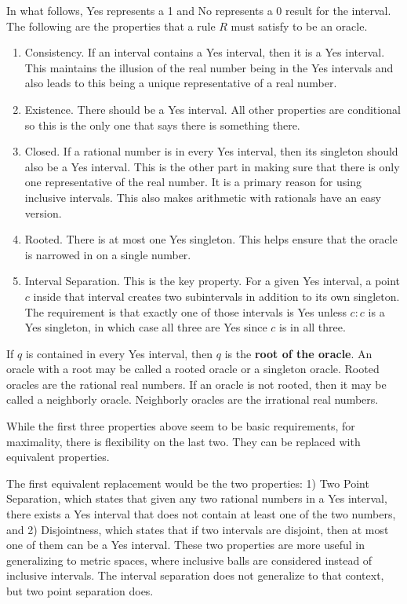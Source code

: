 \documentclass[12pt]{article}
\begin{document}
In what follows, Yes represents a 1 and No represents a 0 result for the interval. The following are the properties that a rule $R$ must satisfy to be an oracle. 

\begin{enumerate}
    \item Consistency. If an interval contains a Yes interval, then it is a Yes interval. This maintains the illusion of the real number being in the Yes intervals and also leads to this being a unique representative of a real number. 
    \item Existence. There should be a Yes interval. All other properties are conditional so this is the only one that says there is something there. 
    \item Closed. If a rational number is in every Yes interval, then its singleton should also be a Yes interval. This is the other part in making sure that there is only one representative of the real number. It is a primary reason for using inclusive intervals. This also makes arithmetic with rationals have an easy version.
    \item Rooted. There is at most one Yes singleton.  This helps ensure that the oracle is narrowed in on a single number. 
    \item Interval Separation. This is the key property. For a given Yes interval, a point $c$ inside that interval creates two subintervals in addition to its own singleton. The requirement is that exactly one of those intervals is Yes unless $c:c$ is a Yes singleton, in which case all three are Yes since $c$ is in all three.  
\end{enumerate}

If $q$ is contained in every Yes interval, then $q$ is the \textbf{root of the oracle}.  An oracle with a root may be called a rooted oracle or a singleton oracle. Rooted oracles are the rational real numbers. If an oracle is not rooted, then it may be called a neighborly oracle. Neighborly oracles are the irrational real numbers. 

While the first three properties above seem to be basic requirements, for maximality, there is flexibility on the last two. They can be replaced with equivalent properties.

The first equivalent replacement would be the two properties: 1) Two Point Separation, which states that given any two rational numbers in a Yes interval, there exists a Yes interval that does not contain at least one of the two numbers, and 2) Disjointness, which states that if two intervals are disjoint, then at most one of them can be a Yes interval. These two properties are more useful in generalizing to metric spaces, where inclusive balls are considered instead of inclusive intervals. The interval separation does not generalize to that context, but two point separation does. 
\end{document}
